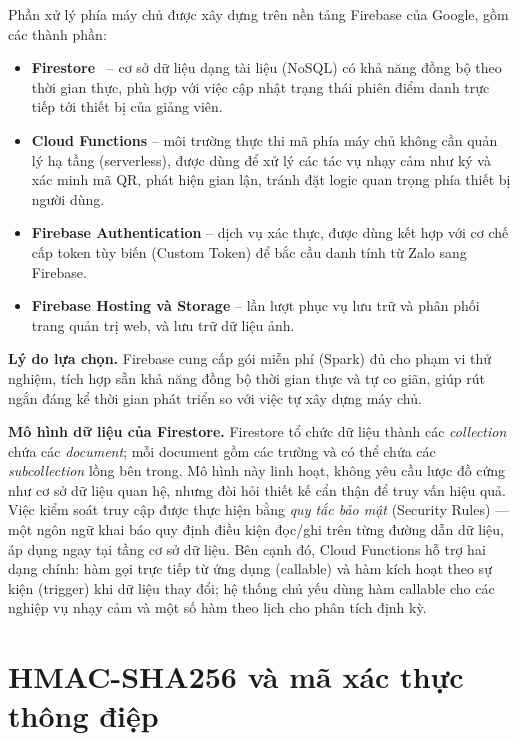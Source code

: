 \documentclass[../main.tex]{subfiles}
\begin{document}
Phần xử lý phía máy chủ được xây dựng trên nền tảng Firebase của Google, gồm các thành
phần:

\begin{itemize}[leftmargin=1.5em]
  \item \textbf{Firestore}~\cite{firestore} -- cơ sở dữ liệu dạng tài liệu (NoSQL) có khả
  năng đồng bộ theo thời gian thực, phù hợp với việc cập nhật trạng thái phiên điểm danh
  trực tiếp tới thiết bị của giảng viên.

  \item \textbf{Cloud Functions} -- môi trường thực thi mã phía máy chủ không cần quản
  lý hạ tầng (serverless), được dùng để xử lý các tác vụ nhạy cảm như ký và xác minh mã
  QR, phát hiện gian lận, tránh đặt logic quan trọng phía thiết bị người dùng.

  \item \textbf{Firebase Authentication} -- dịch vụ xác thực, được dùng kết hợp với cơ
  chế cấp token tùy biến (Custom Token) để bắc cầu danh tính từ Zalo sang Firebase.

  \item \textbf{Firebase Hosting và Storage} -- lần lượt phục vụ lưu trữ và phân phối
  trang quản trị web, và lưu trữ dữ liệu ảnh.
\end{itemize}

\textbf{Lý do lựa chọn.} Firebase cung cấp gói miễn phí (Spark) đủ cho phạm vi thử
nghiệm, tích hợp sẵn khả năng đồng bộ thời gian thực và tự co giãn, giúp rút ngắn đáng kể
thời gian phát triển so với việc tự xây dựng máy chủ.

\textbf{Mô hình dữ liệu của Firestore.} Firestore tổ chức dữ liệu thành các \textit{collection}
chứa các \textit{document}; mỗi document gồm các trường và có thể chứa các
\textit{subcollection} lồng bên trong. Mô hình này linh hoạt, không yêu cầu lược đồ cứng như
cơ sở dữ liệu quan hệ, nhưng đòi hỏi thiết kế cẩn thận để truy vấn hiệu quả. Việc kiểm soát
truy cập được thực hiện bằng \textit{quy tắc bảo mật} (Security Rules) --- một ngôn ngữ khai
báo quy định điều kiện đọc/ghi trên từng đường dẫn dữ liệu, áp dụng ngay tại tầng cơ sở dữ
liệu. Bên cạnh đó, Cloud Functions hỗ trợ hai dạng chính: hàm gọi trực tiếp từ ứng dụng
(callable) và hàm kích hoạt theo sự kiện (trigger) khi dữ liệu thay đổi; hệ thống chủ yếu
dùng hàm callable cho các nghiệp vụ nhạy cảm và một số hàm theo lịch cho phân tích định kỳ.

\section{HMAC-SHA256 và mã xác thực thông điệp}
\label{sec:hmac}
\end{document}
